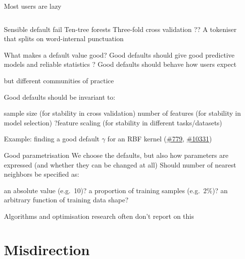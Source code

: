 \documentclass[aspectratio=169, 22pt]{beamer}
\newcommand{\issue}[1]{\href{https://github.com/scikit-learn/scikit-learn/issues/#1}{\##1}}
\begin{document}
\begin{plain}{Most users are lazy}
\begin{columns}[t]
\begin{column}{.39\textwidth}
\end{column}
\end{columns}
\end{plain}

\begin{points}{Sensible default fail}
	\p Ten-tree forests
	\p Three-fold cross validation
	\p ?? A tokeniser that splits on word-internal punctuation
\end{points}

\begin{points}{What makes a default value good?}
	\p Good defaults should give good predictive models and reliable statistics
	\p ? Good defaults should behave how users expect
	\begin{itemize}
			\p but different communities of practice
	\end{itemize}
	\p Good defaults should be invariant to:
	\begin{itemize}
			\p sample size (for stability in cross validation)
			\p number of features (for stability in model selection)
			\p ?feature scaling (for stability in different tasks/datasets)
	\end{itemize}
	\p Example:	finding a good default $\gamma$ for an RBF kernel (\issue{779}, \issue{10331})
\end{points}

\begin{points}{Good parametrisation}
	\p We choose the defaults, but also how parameters are expressed
	\p (and whether they can be changed at all)
	\vfill
	\p Should number of nearest neighbors be specified as:
	\begin{itemize}
		\p an absolute value (e.g.\ 10)?
		\p a proportion of training samples (e.g.\ 2\%)?
		\p an arbitrary function of training data shape?
	\end{itemize}
	\vfill
	\p Algorithms and optimisation research often don't report on this
\end{points}

\section{Misdirection} %

\end{document}

